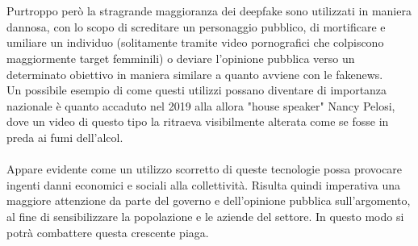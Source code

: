 \documentclass[12pt, a4paper]{article}
\begin{document}
\\\\
Purtroppo però la stragrande maggioranza dei deepfake sono utilizzati in maniera dannosa, con lo scopo di screditare un personaggio pubblico, di mortificare e umiliare un individuo (solitamente tramite video pornografici che colpiscono maggiormente target femminili) o deviare l'opinione pubblica verso un determinato obiettivo in maniera similare a quanto avviene con le fakenews.
\\
Un possibile esempio di come questi utilizzi possano diventare di importanza nazionale è quanto accaduto nel 2019 alla allora "house speaker" Nancy Pelosi, dove un video di questo tipo la ritraeva visibilmente alterata come se fosse in preda ai fumi dell'alcol\cite{FakeVideoNancyPelosi}.
\\\\%
Appare evidente come un utilizzo scorretto di queste tecnologie possa provocare ingenti danni economici e sociali alla collettività. Risulta quindi imperativa una maggiore attenzione da parte del governo e dell'opinione pubblica sull'argomento, al fine di sensibilizzare la popolazione e le aziende del settore. In questo modo si potrà combattere questa crescente piaga.



\newpage
\end{document}
